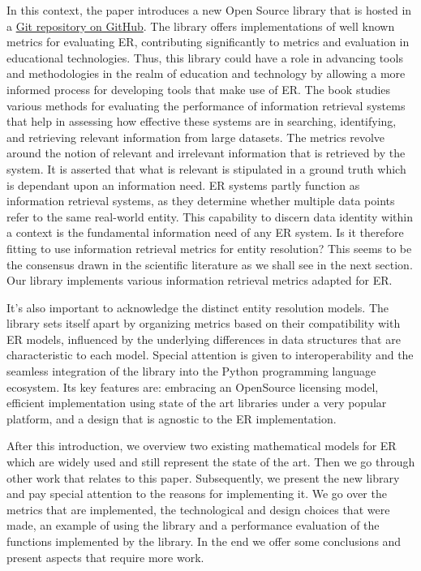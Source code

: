 \documentclass[a4paper,twoside]{article}
\begin{document}
    In this context, the paper introduces a new Open Source library that is
    hosted in a \href{https://github.com/matchescu/py-resolve-metrics}{Git
    repository on GitHub}\cite{matchescu-er-metrics2023}.
    The library offers implementations of well known metrics for evaluating
    ER, contributing significantly to metrics and evaluation in
    educational technologies.
    Thus, this library could have a role in advancing tools and methodologies in
    the realm of education and technology by allowing a more informed process
    for developing tools that make use of ER. 
    The book \cite{manning2008} studies various methods
    for evaluating the performance of information retrieval
    systems that help in assessing how effective these systems are in searching,
    identifying, and retrieving relevant information from large datasets.
    The metrics revolve around the notion of relevant and
    irrelevant information that is retrieved by the system.
    It is asserted that what is relevant is stipulated in a ground truth which
    is dependant upon an information need.
    ER systems partly function as information retrieval systems, as they
    determine whether multiple data points refer to the same real-world
    entity.
    This capability to discern data identity within a context is the fundamental
    information need of any ER system.
    Is it therefore fitting to use information retrieval metrics for entity
    resolution?
    This seems to be the consensus drawn in the scientific literature as we
    shall see in the next section.
    Our library implements various information retrieval metrics adapted for ER.
    
    It's also important to acknowledge the distinct entity resolution models.
    The library sets itself apart by organizing metrics based on their
    compatibility with ER models, influenced by the underlying
    differences in data structures that are characteristic to each model.
    Special attention is given to interoperability and the seamless integration
    of the library into the Python programming language ecosystem.
    Its key features are: embracing an OpenSource licensing model, efficient
    implementation using state of the art libraries under a very popular
    platform, and a design that is agnostic to the ER implementation.
    
    After this introduction, we overview two existing mathematical models for
    ER which are widely used and still represent the state of the art.
    Then we go through other work that relates to this paper.
    Subsequently, we present the new library and pay special attention to the
    reasons for implementing it.
    We go over the metrics that are implemented, the technological and design
    choices that were made, an example of using the library and a performance
    evaluation of the functions implemented by the library.
    In the end we offer some conclusions and present aspects that require more
    work.
\end{document}
